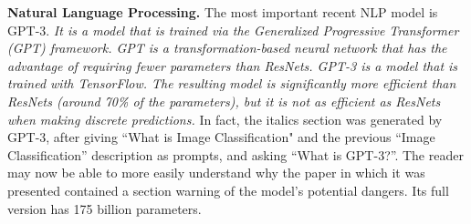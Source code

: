 \documentclass[../main.tex]{subfiles}
\begin{document}
\vspace{4pt}
\textbf{Natural Language Processing.} The most important recent NLP model is GPT-3. \textit{It is a model that is trained via the Generalized Progressive Transformer (GPT) framework. GPT is a transformation-based neural network that has the advantage of requiring fewer parameters than ResNets. GPT-3 is a model that is trained with TensorFlow. The resulting model is significantly more efficient than ResNets (around 70\% of the parameters), but it is not as efficient as ResNets when making discrete predictions.} In fact, the italics section was generated by GPT-3, after giving ``What is Image Classification" and the previous ``Image Classification'' description as prompts, and asking ``What is GPT-3?''. The reader may now be able to more easily understand why the paper in which it was presented contained a section warning of the model's potential dangers\cite{brownLanguageModelsAre2020}. Its full version has 175 billion parameters. 
\end{document}
